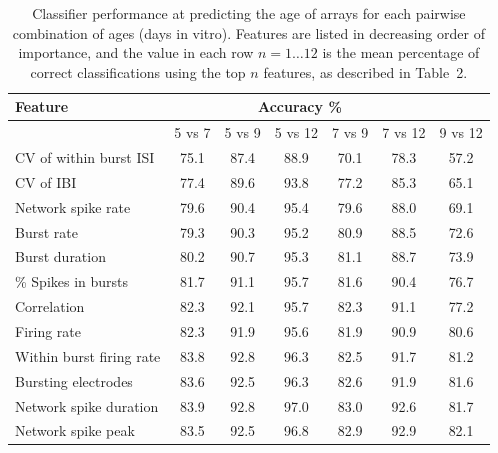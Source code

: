 \documentclass{article}
\begin{document}
\begin{table}
  \centering
  \begin{tabular}{|l|c|c|c|c|c|c|}
	  \hline
	  \textbf{Feature} & \multicolumn{5}{c}{\textbf{Accuracy \%}} & 
	  \\ \hline
	  & 5 vs 7 & 5 vs 9 & 5 vs 12 & 7 vs 9 & 7 vs 12 & 9 vs 12
	  \\ \hline 
		CV of within burst ISI & 75.1 & 87.4 & 88.9 & 70.1 & 78.3 & 57.2
		\\ CV of IBI & 77.4 & 89.6 & 93.8 & 77.2 & 85.3 & 65.1
		\\ Network spike rate& 79.6 & 90.4 & 95.4  & 79.6 & 88.0 & 69.1
		\\ Burst rate & 79.3 & 90.3 & 95.2 & 80.9 & 88.5 & 72.6
		\\ Burst duration& 80.2 & 90.7 & 95.3 & 81.1 & 88.7 & 73.9
		\\ \% Spikes in bursts & 81.7 & 91.1 & 95.7 & 81.6 & 90.4 & 76.7
		\\ Correlation & 82.3 & 92.1 & 95.7 & 82.3 & 91.1 & 77.2
		\\ Firing rate & 82.3 & 91.9 & 95.6 & 81.9 & 90.9 & 80.6
		\\ Within burst firing rate & 83.8 & 92.8 & 96.3 & 82.5 & 91.7 & 81.2
		\\ Bursting electrodes & 83.6 & 92.5 & 96.3 & 82.6 & 91.9 & 81.6
		\\ Network spike duration & 83.9 & 92.8 & 97.0 & 83.0 & 92.6 & 81.7
		\\ Network spike peak & 83.5 & 92.5 & 96.8 & 82.9 & 92.9 & 82.1
	\\ \hline
\end{tabular}
  \caption{Classifier performance at predicting the age of arrays for
    each pairwise combination of ages (days in vitro). Features are listed in
    decreasing order of importance, and the value in each row
    $n=1 \ldots 12$ is the mean percentage of correct classifications using
    the top $n$ features, as described in Table~2.}
\end{table}
\end{document}
